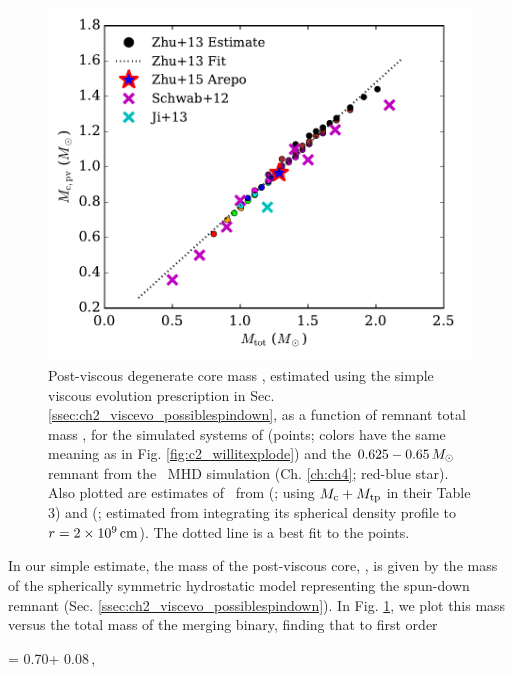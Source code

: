\begin{figure}
\centering
\includegraphics[angle=0,width=0.6\columnwidth]{chapter2_zhu+13/figures/c2a_mcpv.pdf}
\caption{Post-viscous degenerate core mass \Mcpv, estimated using the simple viscous evolution prescription in Sec. \ref{ssec:ch2_viscevo_possiblespindown}, as a function of remnant total mass \Mtot, for the simulated systems of \citeal{zhu+13} (points; colors have the same meaning as in Fig. \ref{fig:c2_willitexplode}) and the $0.625 - 0.65\,\Msun$ remnant from the \arepo\ MHD simulation (Ch. \ref{ch:ch4}; red-blue star).  Also plotted are estimates of \Mcpv\ from \citeauthor{schw+12} (\citeyear{schw+12}; using $M_\mathrm{c} + M_\mathrm{tp}$ in their Table 3) and \citeauthor{ji+13} (\citeyear{ji+13}; estimated from integrating its spherical density profile to $r = 2\times10^9\,\mathrm{cm}$).  The dotted line is a best fit to the \citeal{zhu+13} points.}
\label{fig:c2a_mcpvvsmtot}
\end{figure}

In our simple estimate, the mass of the post-viscous core, \Mcpv, is given by the mass of the spherically symmetric hydrostatic model representing the spun-down remnant (Sec. \ref{ssec:ch2_viscevo_possiblespindown}).  In Fig. \ref{fig:c2a_mcpvvsmtot}, we plot this mass versus the total mass of the merging binary, finding that to first order

\eqbegin
\Mcpv = 0.70\Mtot + 0.08\,\Msun,
\label{eq:c2a_mfit}
\eqend

